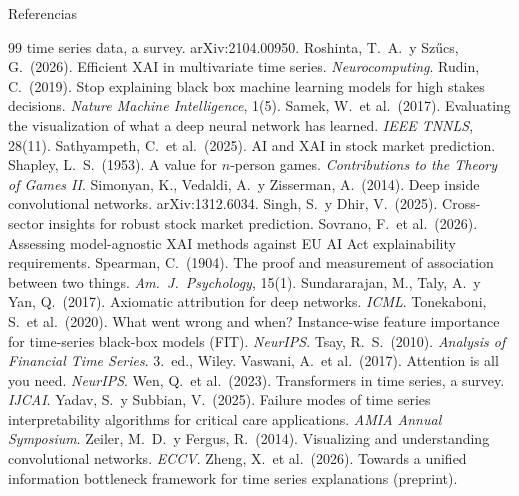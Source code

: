 \documentclass{beamer}
\begin{document}
\begin{frame}[allowframebreaks]{Referencias}
\begin{thebibliography}{99}
        time series data, a survey. arXiv:2104.00950.
         Roshinta, T.\ A.\ y Szűcs, G.\ (2026). Efficient XAI in
        multivariate time series. \emph{Neurocomputing}.
         Rudin, C.\ (2019). Stop explaining black box machine
        learning models for high stakes decisions. \emph{Nature Machine
        Intelligence}, 1(5).
         Samek, W.\ et al.\ (2017). Evaluating the visualization
        of what a deep neural network has learned. \emph{IEEE TNNLS},
        28(11).
         Sathyampeth, C.\ et al.\ (2025). AI and XAI in stock
        market prediction.
         Shapley, L.\ S.\ (1953). A value for $n$-person games.
        \emph{Contributions to the Theory of Games II}.
         Simonyan, K., Vedaldi, A.\ y Zisserman, A.\ (2014). Deep
        inside convolutional networks. arXiv:1312.6034.
         Singh, S.\ y Dhir, V.\ (2025). Cross-sector insights for
        robust stock market prediction.
         Sovrano, F.\ et al.\ (2026). Assessing model-agnostic
        XAI methods against EU AI Act explainability requirements.
         Spearman, C.\ (1904). The proof and measurement of
        association between two things. \emph{Am.\ J.\ Psychology}, 15(1).
         Sundararajan, M., Taly, A.\ y Yan, Q.\ (2017).
        Axiomatic attribution for deep networks. \emph{ICML}.
         Tonekaboni, S.\ et al.\ (2020). What went wrong and
        when? Instance-wise feature importance for time-series black-box
        models (FIT). \emph{NeurIPS}.
         Tsay, R.\ S.\ (2010). \emph{Analysis of Financial Time
        Series}. 3.\ ed., Wiley.
         Vaswani, A.\ et al.\ (2017). Attention is all you need.
        \emph{NeurIPS}.
         Wen, Q.\ et al.\ (2023). Transformers in time series, a
        survey. \emph{IJCAI}.
         Yadav, S.\ y Subbian, V.\ (2025). Failure modes of time
        series interpretability algorithms for critical care applications.
        \emph{AMIA Annual Symposium}.
         Zeiler, M.\ D.\ y Fergus, R.\ (2014). Visualizing and
        understanding convolutional networks. \emph{ECCV}.
         Zheng, X.\ et al.\ (2026). Towards a unified
        information bottleneck framework for time series explanations
        (preprint).
    \end{thebibliography}
\end{frame}
\end{document}
